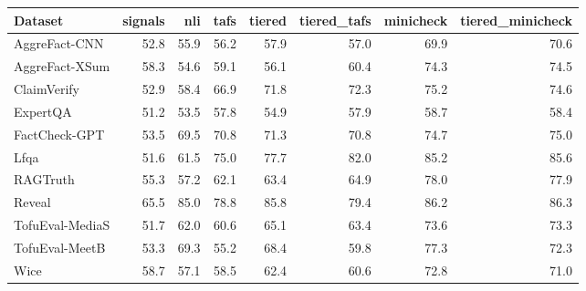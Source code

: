 \begin{tabular}{lrrrrrrr}
\toprule
Dataset & signals & nli & tafs & tiered & tiered_tafs & minicheck & tiered_minicheck \\
\midrule
AggreFact-CNN & 52.8 & 55.9 & 56.2 & 57.9 & 57.0 & 69.9 & 70.6 \\
AggreFact-XSum & 58.3 & 54.6 & 59.1 & 56.1 & 60.4 & 74.3 & 74.5 \\
ClaimVerify & 52.9 & 58.4 & 66.9 & 71.8 & 72.3 & 75.2 & 74.6 \\
ExpertQA & 51.2 & 53.5 & 57.8 & 54.9 & 57.9 & 58.7 & 58.4 \\
FactCheck-GPT & 53.5 & 69.5 & 70.8 & 71.3 & 70.8 & 74.7 & 75.0 \\
Lfqa & 51.6 & 61.5 & 75.0 & 77.7 & 82.0 & 85.2 & 85.6 \\
RAGTruth & 55.3 & 57.2 & 62.1 & 63.4 & 64.9 & 78.0 & 77.9 \\
Reveal & 65.5 & 85.0 & 78.8 & 85.8 & 79.4 & 86.2 & 86.3 \\
TofuEval-MediaS & 51.7 & 62.0 & 60.6 & 65.1 & 63.4 & 73.6 & 73.3 \\
TofuEval-MeetB & 53.3 & 69.3 & 55.2 & 68.4 & 59.8 & 77.3 & 72.3 \\
Wice & 58.7 & 57.1 & 58.5 & 62.4 & 60.6 & 72.8 & 71.0 \\
\bottomrule
\end{tabular}
